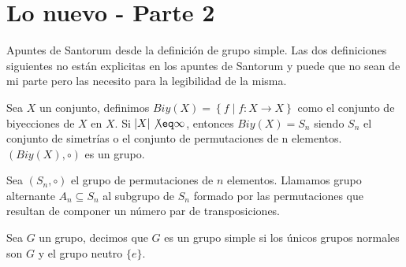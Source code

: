 
\chapter{Lo nuevo - Parte 2}

Apuntes de Santorum desde la definición de grupo simple.
Las dos definiciones siguientes no están explicitas en los apuntes de Santorum y puede que no sean de mi parte pero las necesito para la legibilidad de la misma.
\begin{dfn}
	\label{dfn:grupobiy}
	Sea $X$ un conjunto, definimos $Biy(X)=\left\{f\mid f : X \longrightarrow X  \right\}$ como el conjunto de biyecciones de $X$ en $X$. Si $|X| \not \eq \infty$, entonces $Biy(X) = S_n$ siendo $S_n$ el conjunto de simetrías o el conjunto de permutaciones de n elementos. $(Biy(X), \circ)$ es un grupo.
\end{dfn}

\begin{dfn}
	\label{dfn:grupopermpar}
	Sea $(S_n,\circ)$ el grupo de permutaciones de $n$ elementos. Llamamos grupo alternante $A_n \subseteq S_n$ al subgrupo de $S_n$ formado por las permutaciones que resultan de componer un número par de transposiciones.
\end{dfn}

\begin{dfn}
	\label{dfn:simple}
	Sea $G$ un grupo, decimos que $G$ es un grupo simple si los únicos grupos normales son $G$ y el grupo neutro $\{e\}.$
\end{dfn}


